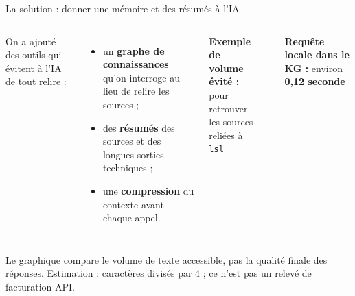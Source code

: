\documentclass[aspectratio=169,11pt]{beamer}
\begin{document}
\begin{frame}{La solution : donner une mémoire et des résumés à l'IA}
\footnotesize
\begin{columns}
On a ajouté des outils qui évitent à l'IA de tout relire :
\begin{itemize}
    \item un \textbf{graphe de connaissances} qu'on interroge au lieu de relire les sources ;
    \item des \textbf{résumés} des sources et des longues sorties techniques ;
    \item une \textbf{compression} du contexte avant chaque appel.
\end{itemize}
\vspace{0.1cm}
\textbf{Exemple de volume évité :}\\
pour retrouver les sources reliées à \texttt{lsl}

\centering
{}
\\[-0.05cm]
\colorbox{mygreen!12}{\parbox{0.88\linewidth}{\centering
\textbf{Requête locale dans le KG :} environ \textbf{0,12 seconde}}}
\end{columns}
\vspace{0.05cm}

{\tiny\textcolor{mygray}{Le graphique compare le volume de texte accessible,
pas la qualité finale des réponses. Estimation : caractères divisés par 4 ;
ce n'est pas un relevé de facturation API.}}
\end{frame}

\end{document}
